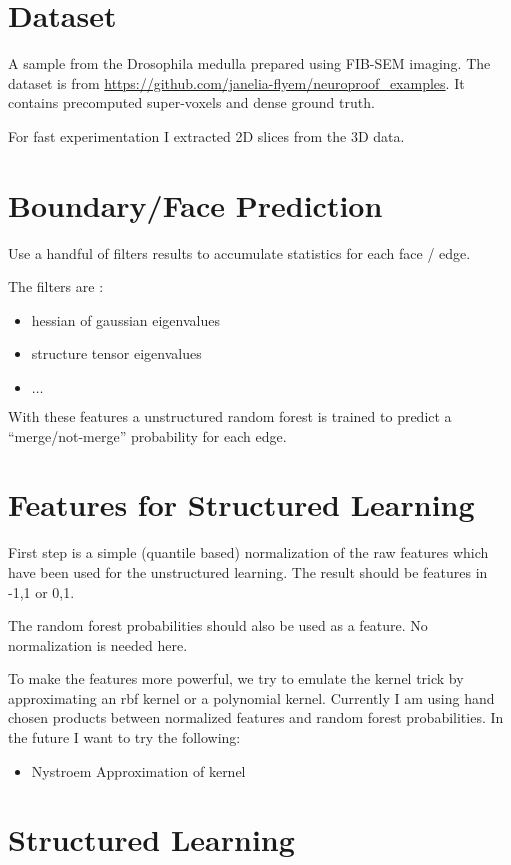 \documentclass{article}
\begin{document}
\section{Dataset}
A sample from the Drosophila medulla prepared using FIB-SEM imaging.
The dataset is from \url{https://github.com/janelia-flyem/neuroproof_examples}.
It contains precomputed super-voxels and dense ground truth.

For fast experimentation I extracted 2D slices from the 3D data.

\section{Boundary/Face Prediction}

Use a handful of filters results to accumulate
statistics for each face / edge.

The filters are :
\begin{itemize}
\item hessian of gaussian eigenvalues
\item structure tensor eigenvalues
\item$ \ldots$
\end{itemize}


With these features a unstructured random 
forest is trained to predict a ``merge/not-merge''
probability for each edge.



\section{Features for Structured Learning}
First step is a simple (quantile based)
normalization of the raw features 
which have been used for the unstructured learning.
The result should be features in -1,1 or 0,1.

The random forest probabilities should also be used
as a feature. No normalization is needed here.

To make the features more powerful, we try
to emulate the kernel trick by approximating an
rbf kernel or a polynomial kernel.
Currently I am using hand chosen products
between normalized features and random forest probabilities.
In the future I want to try the following:

\begin{itemize}
\item Nystroem Approximation of kernel
\end{itemize}


\section{Structured Learning}
\end{document}
